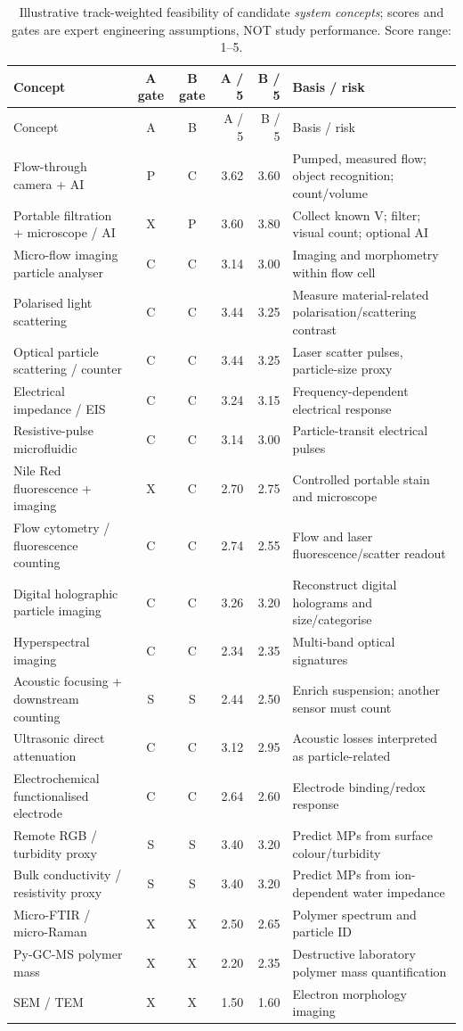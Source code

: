 \footnotesize
\begin{longtable}{@{}p{4.05cm}ccrrp{5.45cm}@{}}
\caption{Illustrative track-weighted feasibility of candidate \emph{system concepts}; scores and gates are expert engineering assumptions, NOT study performance. Score range: 1--5.}\label{tab:weighted}\\
\toprule Concept & A gate & B gate & A / 5 & B / 5 & Basis / risk \\ \midrule
\endfirsthead
\toprule Concept & A & B & A / 5 & B / 5 & Basis / risk \\ \midrule
\endhead
\bottomrule\endfoot
Flow-through camera + AI & P & C & 3.62 & 3.60 & Pumped, measured flow; object recognition; count/volume \\
Portable filtration + microscope / AI & X & P & 3.60 & 3.80 & Collect known V; filter; visual count; optional AI \\
Micro-flow imaging particle analyser & C & C & 3.14 & 3.00 & Imaging and morphometry within flow cell \\
Polarised light scattering & C & C & 3.44 & 3.25 & Measure material-related polarisation/scattering contrast \\
Optical particle scattering / counter & C & C & 3.44 & 3.25 & Laser scatter pulses, particle-size proxy \\
Electrical impedance / EIS & C & C & 3.24 & 3.15 & Frequency-dependent electrical response \\
Resistive-pulse microfluidic & C & C & 3.14 & 3.00 & Particle-transit electrical pulses \\
Nile Red fluorescence + imaging & X & C & 2.70 & 2.75 & Controlled portable stain and microscope \\
Flow cytometry / fluorescence counting & C & C & 2.74 & 2.55 & Flow and laser fluorescence/scatter readout \\
Digital holographic particle imaging & C & C & 3.26 & 3.20 & Reconstruct digital holograms and size/categorise \\
Hyperspectral imaging & C & C & 2.34 & 2.35 & Multi-band optical signatures \\
Acoustic focusing + downstream counting & S & S & 2.44 & 2.50 & Enrich suspension; another sensor must count \\
Ultrasonic direct attenuation & C & C & 3.12 & 2.95 & Acoustic losses interpreted as particle-related \\
Electrochemical functionalised electrode & C & C & 2.64 & 2.60 & Electrode binding/redox response \\
Remote RGB / turbidity proxy & S & S & 3.40 & 3.20 & Predict MPs from surface colour/turbidity \\
Bulk conductivity / resistivity proxy & S & S & 3.40 & 3.20 & Predict MPs from ion-dependent water impedance \\
Micro-FTIR / micro-Raman & X & X & 2.50 & 2.65 & Polymer spectrum and particle ID \\
Py-GC-MS polymer mass & X & X & 2.20 & 2.35 & Destructive laboratory polymer mass quantification \\
SEM / TEM & X & X & 1.50 & 1.60 & Electron morphology imaging \\
\end{longtable}\normalsize
